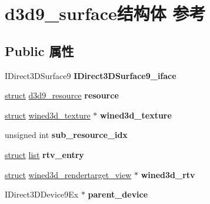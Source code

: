 \hypertarget{structd3d9__surface}{}\section{d3d9\+\_\+surface结构体 参考}
\label{structd3d9__surface}
\subsection*{Public 属性}
\begin{DoxyCompactItemize}
\item 
\mbox{\label{structd3d9__surface_a6400c428a48e2294b7735efda5675c2e}} 
I\+Direct3\+D\+Surface9 {\bfseries I\+Direct3\+D\+Surface9\+\_\+iface}
\item 
\mbox{\label{structd3d9__surface_a97506c97bc3fd9d3f98ba91fc9765c4d}} 
\hyperlink{interfacestruct}{struct} \hyperlink{structd3d9__resource}{d3d9\+\_\+resource} {\bfseries resource}
\item 
\mbox{\label{structd3d9__surface_a1f2e1fc59d1ffb07b71400b396eedf7b}} 
\hyperlink{interfacestruct}{struct} \hyperlink{structwined3d__texture}{wined3d\+\_\+texture} $\ast$ {\bfseries wined3d\+\_\+texture}
\item 
\mbox{\label{structd3d9__surface_ae77bb140d440143bc72f4e725781c37a}} 
unsigned int {\bfseries sub\+\_\+resource\+\_\+idx}
\item 
\mbox{\label{structd3d9__surface_a5cefec6ffa5603370e31c05377957ec1}} 
\hyperlink{interfacestruct}{struct} \hyperlink{classlist}{list} {\bfseries rtv\+\_\+entry}
\item 
\mbox{\label{structd3d9__surface_acb166e630d4626ccea240248c328dbd0}} 
\hyperlink{interfacestruct}{struct} \hyperlink{structwined3d__rendertarget__view}{wined3d\+\_\+rendertarget\+\_\+view} $\ast$ {\bfseries wined3d\+\_\+rtv}
\item 
\mbox{\label{structd3d9__surface_a1962c36dbe89e9fa4c61f52a01b849b6}} 
I\+Direct3\+D\+Device9\+Ex $\ast$ {\bfseries parent\+\_\+device}
\item 
\mbox{\label{structd3d9__surface_a02a7ec24f1f7d60567f92af8a79788df}} 

\end{DoxyCompactItemize}
